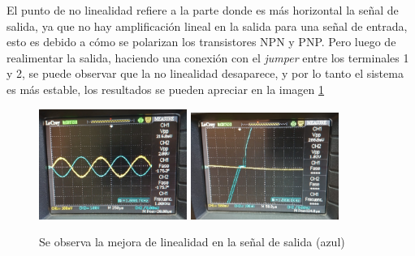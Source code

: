 \documentclass[letterpaper, 10 pt, conference]{ieeeconf}  %
\begin{document}
 El punto de no linealidad refiere a la parte donde es más horizontal la señal de salida, ya que no hay amplificación lineal en la salida para una señal de entrada, esto es debido a cómo se polarizan los transistores NPN y PNP. Pero luego de realimentar la salida, haciendo una conexión con el \textit{jumper} entre los terminales 1 y 2, se puede observar que la no linealidad desaparece, y por lo tanto el sistema es más estable, los resultados se pueden apreciar en la imagen \ref{imagen:linealidad}

\begin{figure}[H]
   \centering
   \includegraphics[width=0.43\textwidth]{./linealidad2.jpeg}
   \includegraphics[width=0.43\textwidth]{./linealidad.jpeg}
   \caption{Se observa la mejora de linealidad en la señal de salida (azul)}
   \label{imagen:linealidad}
 \end{figure}


%
\end{document}
